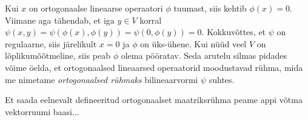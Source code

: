 Kui $x$ on ortogonaalse lineaarse operaatori $\phi$ tuumast, siis
kehtib $\phi(x) = 0$. Viimane aga tähendab, et iga $y \in V$ korral
$\psi(x, y) = \psi(\phi(x), \phi(y)) = \psi(0, \phi(y)) = 0$. Kokkuvõttes,
et $\psi$ on regulaarne, siis järelikult $x = 0$ ja $\phi$ on üks-ühene.
Kui nüüd veel $V$ on lõplikumõõtmeline, siis peab $\phi$ olema pööratav.
Seda arutelu silmas pidades võime öelda, et ortogonaalsed lineaarsed
operaatorid moodustavad rühma, mida me nimetame \emph{ortogonaalsed rühmaks}
bilineaarvormi $\psi$ suhtes.

Et saada eelnevalt defineeritud ortogonaalset maatriksrühma peame appi võtma
vektorruumi baasi...
